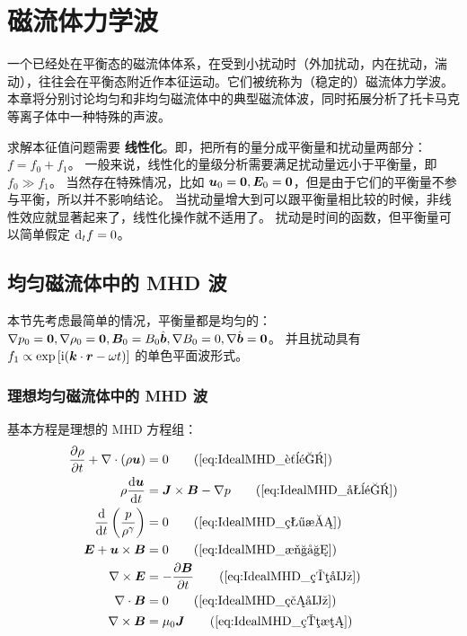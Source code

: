 
\chapter{磁流体力学波}

一个已经处在平衡态的磁流体体系，在受到小扰动时（外加扰动，内在扰动，湍动），往往会在平衡态附近作本征运动。它们被统称为（稳定的）磁流体力学波。本章将分别讨论均匀和非均匀磁流体中的典型磁流体波，同时拓展分析了托卡马克等离子体中一种特殊的声波。

求解本征值问题需要 \textbf{线性化}。即，把所有的量分成平衡量和扰动量两部分：$ f = f_0 + f_1 $。
一般来说，线性化的量级分析需要满足扰动量远小于平衡量，即 $f_0 \gg f_1$。
当然存在特殊情况，比如 $ \vector{u}_0 = \vector{0}, \vector{E}_0 = \vector{0} $，但是由于它们的平衡量不参与平衡，所以并不影响结论。
当扰动量增大到可以跟平衡量相比较的时候，非线性效应就显著起来了，线性化操作就不适用了。
扰动是时间的函数，但平衡量可以简单假定 $ \deriv{f}{t} = 0 $。

\section{均匀磁流体中的 MHD 波}

本节先考虑最简单的情况，平衡量都是均匀的：
$ \grad{p_0} = \vector{0}, \grad{\rho_0} = \vector{0}, \vector{B}_0 = B_0 \hat{\vector{b}}, \grad{B_0} = 0, \grad{\hat{\vector{b}}} = \vector{0} $。
并且扰动具有
$ f_1 \propto \exp{[\im (\vector{k} \cdot \vector{r} - \omega t)]} $ 的单色平面波形式。

\subsection{理想均匀磁流体中的 MHD 波}

基本方程是理想的 MHD 方程组：
\begin{align}
\pDeriv{\rho}{t} + \dive{\left(\rho \vector{u}\right)} &= 0
\tag{\ref{eq:IdealMHD_质量}} \\
\rho \Deriv{\vector{u}}{t} &= \vector{J} \times \vector{B} - \grad{p}
\tag{\ref{eq:IdealMHD_动量}} \\
\Deriv{}{t} \left(\frac{p}{\rho^\gamma}\right) &= 0
\tag{\ref{eq:IdealMHD_状态}} \\
\vector{E} + \vector{u} \times \vector{B} &= 0
\tag{\ref{eq:IdealMHD_欧姆}} \\
\curl{\vector{E}} &= - \pDeriv{\vector{B}}{t}
\tag{\ref{eq:IdealMHD_电场}} \\
\dive{\vector{B}} &= 0
\tag{\ref{eq:IdealMHD_磁场}} \\
\curl{\vector{B}} &= \mu_0 \vector{J}
\tag{\ref{eq:IdealMHD_电流}}
\end{align}

